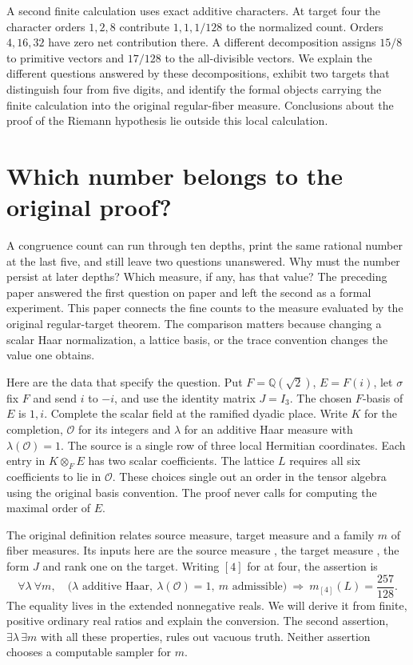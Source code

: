 \documentclass[12pt,letterpaper]{article}
\newcommand{\code}[1]{\texttt{\detokenize{#1}}}
\begin{document}
\par
A second finite calculation uses exact additive characters. At target four the character orders $1,2,8$ contribute $1,1,1/128$ to the normalized count. Orders $4,16,32$ have zero net contribution there. A different decomposition assigns $15/8$ to primitive vectors and $17/128$ to the all-divisible vectors. We explain the different questions answered by these decompositions, exhibit two targets that distinguish four from five digits, and identify the formal objects carrying the finite calculation into the original regular-fiber measure. Conclusions about the proof of the Riemann hypothesis lie outside this local calculation.
\clearpage{\small\setlength{\parskip}{0pt}\tableofcontents}\clearpage{}
\section{Which number belongs to the original proof?}
A congruence count can run through ten depths, print the same rational number at the last five, and still leave two questions unanswered. Why must the number persist at later depths? Which measure, if any, has that value? The preceding paper answered the first question on paper and left the second as a formal experiment. This paper connects the fine counts to the measure evaluated by the original regular-target theorem. The comparison matters because changing a scalar Haar normalization, a lattice basis, or the trace convention changes the value one obtains.
\par
Here are the data that specify the question. Put $F=\mathbb Q(\sqrt2)$, $E=F(i)$, let $\sigma$ fix $F$ and send $i$ to $-i$, and use the identity matrix $J=I_3$. The chosen $F$-basis of $E$ is $1,i$. Complete the scalar field at the ramified dyadic place. Write $K$ for the completion, $\mathcal O$ for its integers and $\lambda$ for an additive Haar measure with $\lambda(\mathcal O)=1$. The source is a single row of three local Hermitian coordinates. Each entry in $K\otimes_FE$ has two scalar coefficients. The lattice $L$ requires all six coefficients to lie in $\mathcal O$. These choices single out an order in the tensor algebra using the original basis convention. The proof never calls for computing the maximal order of $E$.
\par
The original definition \code{IsGramFib} relates source measure, target measure and a family $m$ of fiber measures. Its inputs here are the source measure \code{coordW}, the target measure \code{coordHerm}, the form $J$ and rank one on the target. Writing $[4]$ for \code{hermScal} at four, the assertion is
\[
 \forall\lambda\ \forall m,\quad
 \bigl(\lambda\text{ additive Haar},\ \lambda(\mathcal O)=1,\ m\text{ admissible}\bigr)
 \ \Longrightarrow\ m_{[4]}(L)=\frac{257}{128}.
\]
The equality lives in the extended nonnegative reals. We will derive it from finite, positive ordinary real ratios and explain the conversion. The second assertion, $\exists\lambda\,\exists m$ with all these properties, rules out vacuous truth. Neither assertion chooses a computable sampler for $m$.
\end{document}
